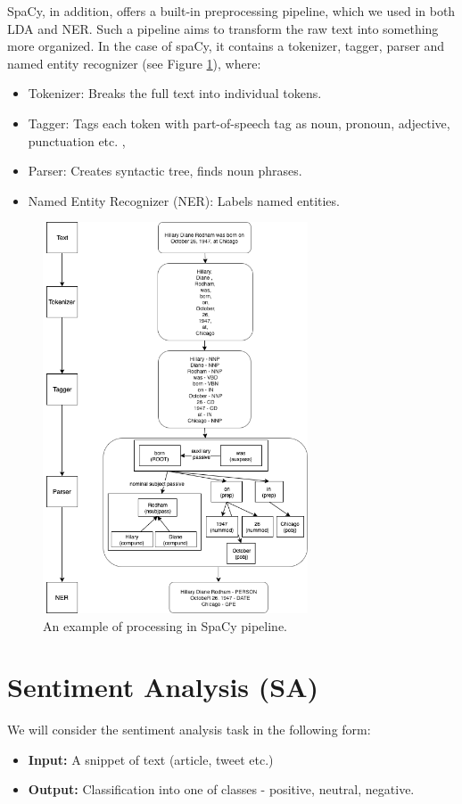 SpaCy, in addition, offers a built-in preprocessing pipeline, which we  used in both LDA and NER. Such a pipeline aims to transform the raw text into something more organized. In the case of spaCy, it contains a tokenizer, tagger, parser and named entity recognizer (see Figure \ref{fig:pipeline}), where:
\begin{itemize}
  \item Tokenizer: Breaks the full text into individual tokens.
\item Tagger: Tags each token with part-of-speech tag as noun, pronoun, adjective, punctuation etc. \cite{tags},
\item Parser: Creates syntactic tree, finds noun phrases.
\item Named Entity Recognizer (NER): Labels named entities.
\end{itemize}
\begin{figure}[H]
\centering
\includegraphics[width=0.7\textwidth]{diagrams/PIPELINE.png}
\caption{An example of processing in SpaCy pipeline.}
\label{fig:pipeline}
\end{figure}

\section{Sentiment Analysis (SA)}
\label{sec:sentiment}
We will consider the sentiment analysis task in the following form:
\begin{itemize}
    \item \textbf{Input:} A snippet of text (article, tweet etc.)
    \item \textbf{Output:} Classification into one of classes - positive, neutral, negative. 
\end{itemize}

